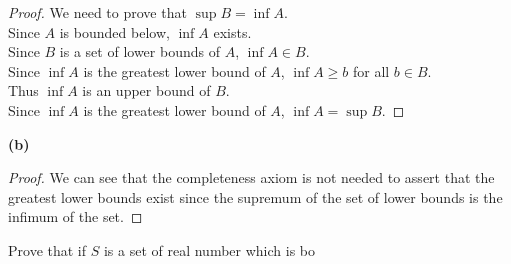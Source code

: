 \documentclass[answers,12pt,addpoints]{exam}
\begin{document}
\begin{questions}
\begin{solution}
\begin{proof}
            We need to prove that $\sup B = \inf A$. \\
            Since $A$ is bounded below, $\inf A$ exists. \\
            Since $B$ is a set of lower bounds of $A$, $\inf A \in B$. \\
            Since $\inf A$ is the greatest lower bound of $A$, $\inf A \geq b$ for all $b \in B$. \\
            Thus $\inf A$ is an upper bound of $B$. \\
            Since $\inf A$ is the greatest lower bound of $A$, $\inf A = \sup B$.
        \end{proof}
        \textbf{(b)}\\
        \begin{proof}
            We can see that the completeness axiom is not needed to assert that the greatest lower bounds exist since the supremum of the set of lower bounds is the infimum of the set.
        \end{proof}
    \end{solution}
    \question Prove that if $S$ is a set of real number which is bo








\end{questions}
\end{document}
